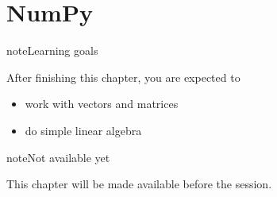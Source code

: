 \documentclass[letterpaper,10pt,english]{jupyterBook}
\begin{document}
\sphinxstepscope


\chapter{NumPy}
\label{\detokenize{placeholder_notebooks/5_NumPy/5_NumPy_student:numpy}}\label{\detokenize{placeholder_notebooks/5_NumPy/5_NumPy_student::doc}}
\begin{sphinxadmonition}{note}{Learning goals}

\sphinxAtStartPar
After finishing this chapter, you are expected to
\begin{itemize}
\item {} 
\sphinxAtStartPar
work with vectors and matrices

\item {} 
\sphinxAtStartPar
do simple linear algebra

\end{itemize}
\end{sphinxadmonition}

\begin{sphinxadmonition}{note}{Not available yet}

\sphinxAtStartPar
This chapter will be made available before the session.
\end{sphinxadmonition}

\sphinxstepscope
\end{document}
